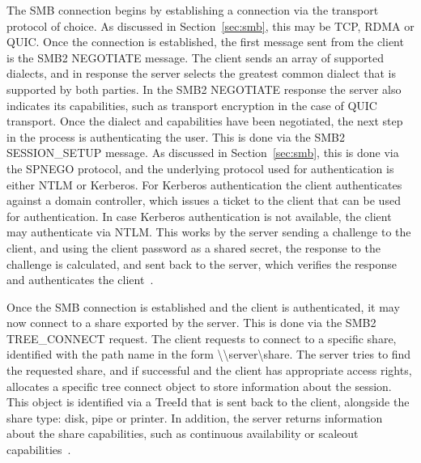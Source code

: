 \documentclass[english, 12pt, a4paper, elec, utf8, a-2b, online]{aaltothesis}
\begin{document}
The SMB connection begins by establishing a connection via the transport protocol
of choice. As discussed in Section~\ref{sec:smb}, this may be TCP, RDMA or QUIC.
Once the connection is established, the first message sent from the client is
the SMB2 NEGOTIATE message. The client sends an array of supported dialects,
and in response the server selects the greatest common dialect that is supported
by both parties. In the SMB2 NEGOTIATE response the server also indicates its capabilities,
such as transport encryption in the case of QUIC transport. Once the dialect and
capabilities have been negotiated, the next step in the process is authenticating
the user. This is done via the SMB2 SESSION\_SETUP message. As discussed in Section~\ref{sec:smb},
this is done via the SPNEGO protocol, and the underlying protocol used for authentication
is either NTLM or Kerberos. For Kerberos authentication the client authenticates
against a domain controller, which issues a ticket to the client that can be used for
authentication. In case Kerberos authentication is not available, the client may
authenticate via NTLM. This works by the server sending a challenge to the client,
and using the client password as a shared secret, the response to the challenge is
calculated, and sent back to the server, which verifies the response and authenticates
the client~\cite{smb2_tech}.

Once the SMB connection is established and the client is authenticated, it may now connect
to a share exported by the server. This is done via the SMB2 TREE\_CONNECT request.
The client requests to connect to a specific share, identified with the path name
in the form {\textbackslash\textbackslash}server{\textbackslash}share. The server
tries to find the requested share, and if successful and the client has appropriate
access rights, allocates a specific tree connect object to store information about the session.
This object is identified via a TreeId that is sent back to the client, alongside
the share type: disk, pipe or printer. In addition,
the server returns information about the share capabilities, such as continuous availability
or scaleout capabilities~\cite{smb2_tech}.
\end{document}
